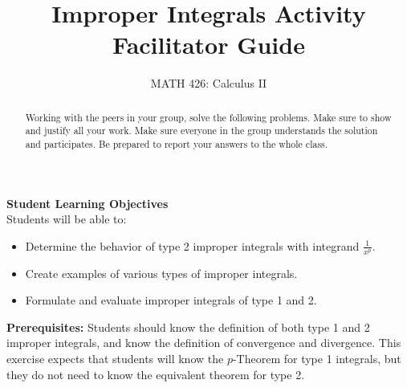\documentclass{ximera}
\title{Improper Integrals Activity Facilitator Guide}
\author{MATH 426: Calculus II}
\begin{document}
\begin{abstract}
   Working with the peers in your group, solve the following problems. Make sure to show and justify all your work. Make sure everyone in the group understands the solution and participates. Be prepared to report your answers to the whole class. 
\end{abstract}
\maketitle

\textbf{Student Learning Objectives}\\
Students will be able to:
\begin{itemize}
    \item Determine the behavior of type 2 improper integrals with integrand $\frac{1}{x^p}$.
    \item Create examples of various types of improper integrals.
    \item Formulate and evaluate improper integrals of type 1 and 2.
\end{itemize}

\textbf{Prerequisites:} Students should know the definition of both type 1 and 2 improper integrals, and know the definition of convergence and divergence.  This exercise expects that students will know the $p$-Theorem for type 1 integrals, but they do not need to know the equivalent theorem for type 2.
\end{document}
